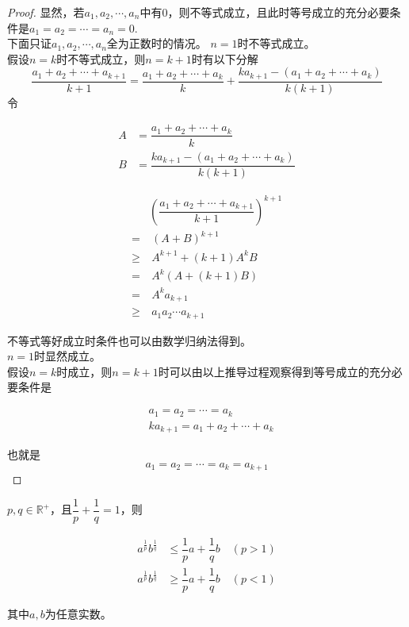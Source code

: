 \begin{proof}
    
    显然，若$a_1, a_2, \cdots, a_n$中有$0$，则不等式成立，且此时等号成立的充分必要条件是$a_1 = a_2 = \cdots = a_n = 0$. \\
    下面只证$a_1, a_2, \cdots, a_n$全为正数时的情况。
    $n = 1$时不等式成立。\\
    假设$n = k$时不等式成立，则$n = k + 1$时有以下分解
    $$\dfrac{a_1 + a_2 + \cdots + a_{k + 1}}{k + 1} = \dfrac{a_1 + a_2 + \cdots + a_{k}}{k} + \dfrac{ka_{k + 1} - (a_1 + a_2 + \cdots + a_k)}{k(k + 1)}$$
    令
    
    \begin{align*}
        A & = \dfrac{a_1 + a_2 + \cdots + a_{k}}{k} \\
        B & = \dfrac{ka_{k + 1} - (a_1 + a_2 + \cdots + a_k)}{k(k + 1)}
    \end{align*}

    \begin{align*}
        & \left( \dfrac{a_1 + a_2 + \cdots + a_{k + 1}}{k + 1} \right)^{k + 1} \\
        = & \  (A + B)^{k + 1} \\
        \geq & \  A^{k + 1} + (k + 1) A^k B \\
        = & \ A^k(A + (k + 1)B) \\
        = & \ A^k a_{k + 1} \\
        \geq & \ a_1 a_2 \cdots a_{k + 1}
    \end{align*}

    不等式等好成立时条件也可以由数学归纳法得到。\\
    $n = 1$时显然成立。\\
    假设$n = k$时成立，则$n = k + 1$时可以由以上推导过程观察得到等号成立的充分必要条件是

    \begin{align*}
        & a_1 = a_2 = \cdots = a_k \\
        & ka_{k + 1} = a_1 + a_2 + \cdots + a_k
    \end{align*}

    也就是
    $$a_1 = a_2 = \cdots = a_k = a_{k + 1}$$
\end{proof}

\begin{theorem}[Young不等式]

    $p, q \in \mathbb{R}^+$，且$\dfrac{1}{p} + \dfrac{1}{q} = 1$，则

    \begin{align*}
        a^{\frac{1}{p}} b^{\frac{1}{q}} & \leq \dfrac{1}{p}a + \dfrac{1}{q}b \quad (p > 1) \\
        a^{\frac{1}{p}} b^{\frac{1}{q}} & \geq \dfrac{1}{p}a + \dfrac{1}{q}b \quad (p < 1)
    \end{align*}

    其中$a, b$为任意实数。

\end{theorem}

